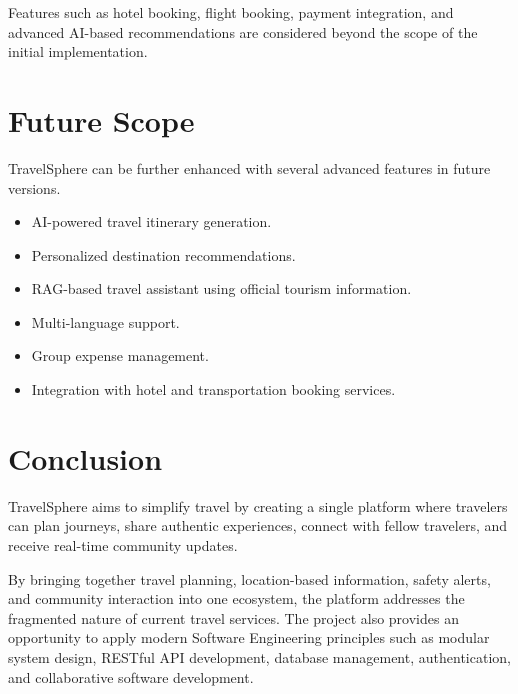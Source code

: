 \documentclass[12pt,a4paper]{article}
\begin{document}
Features such as hotel booking, flight booking, payment integration, and advanced AI-based recommendations are considered beyond the scope of the initial implementation.


\section{Future Scope}

TravelSphere can be further enhanced with several advanced features in future versions.

\begin{itemize}

\item AI-powered travel itinerary generation.

\item Personalized destination recommendations.

\item RAG-based travel assistant using official tourism information.

\item Multi-language support.

\item Group expense management.

\item Integration with hotel and transportation booking services.

\end{itemize}


\section{Conclusion}

TravelSphere aims to simplify travel by creating a single platform where travelers can plan journeys, share authentic experiences, connect with fellow travelers, and receive real-time community updates.

By bringing together travel planning, location-based information, safety alerts, and community interaction into one ecosystem, the platform addresses the fragmented nature of current travel services. The project also provides an opportunity to apply modern Software Engineering principles such as modular system design, RESTful API development, database management, authentication, and collaborative software development.
\end{document}
